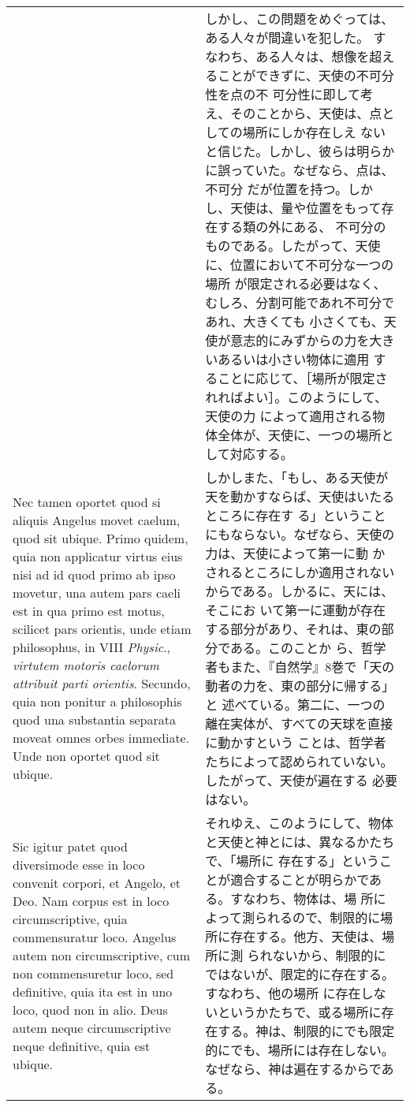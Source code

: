 \documentclass[10pt]{jsarticle} %
\begin{document}
\begin{longtable}{p{21em}p{21em}}
&
しかし、この問題をめぐっては、ある人々が間違いを犯した。
すなわち、ある人々は、想像を超えることができずに、天使の不可分性を点の不
 可分性に即して考え、そのことから、天使は、点としての場所にしか存在しえ
 ないと信じた。しかし、彼らは明らかに誤っていた。なぜなら、点は、不可分
 だが位置を持つ。しかし、天使は、量や位置をもって存在する類の外にある、
 不可分のものである。したがって、天使に、位置において不可分な一つの場所
 が限定される必要はなく、むしろ、分割可能であれ不可分であれ、大きくても
 小さくても、天使が意志的にみずからの力を大きいあるいは小さい物体に適用
 することに応じて、［場所が限定されればよい］。このようにして、天使の力
 によって適用される物体全体が、天使に、一つの場所として対応する。

\\


Nec tamen oportet quod si aliquis Angelus movet caelum, quod sit
ubique. Primo quidem, quia non applicatur virtus eius nisi ad id quod
primo ab ipso movetur, una autem pars caeli est in qua primo est motus,
scilicet pars orientis, unde etiam philosophus, in VIII {\itshape
Physic}., {\itshape virtutem motoris caelorum attribuit parti
orientis}. Secundo, quia non ponitur a philosophis quod una substantia
separata moveat omnes orbes immediate. Unde non oportet quod sit ubique.


&

しかしまた、「もし、ある天使が天を動かすならば、天使はいたるところに存在す
 る」ということにもならない。なぜなら、天使の力は、天使によって第一に動
 かされるところにしか適用されないからである。しかるに、天には、そこにお
 いて第一に運動が存在する部分があり、それは、東の部分である。このことか
 ら、哲学者もまた、『自然学』8巻で「天の動者の力を、東の部分に帰する」と
 述べている。第二に、一つの離在実体が、すべての天球を直接に動かすという
 ことは、哲学者たちによって認められていない。したがって、天使が遍在する
 必要はない。



\\

Sic igitur patet quod
diversimode esse in loco convenit corpori, et Angelo, et Deo. Nam corpus
est in loco circumscriptive, quia commensuratur loco. Angelus autem non
circumscriptive, cum non commensuretur loco, sed definitive, quia ita
est in uno loco, quod non in alio. Deus autem neque circumscriptive
neque definitive, quia est ubique.

&

それゆえ、このようにして、物体と天使と神とには、異なるかたちで、「場所に
 存在する」ということが適合することが明らかである。すなわち、物体は、場
 所によって測られるので、制限的に場所に存在する。他方、天使は、場所に測
 られないから、制限的にではないが、限定的に存在する。すなわち、他の場所
 に存在しないというかたちで、或る場所に存在する。神は、制限的にでも限定
 的にでも、場所には存在しない。なぜなら、神は遍在するからである。


\end{longtable}
\end{document}

